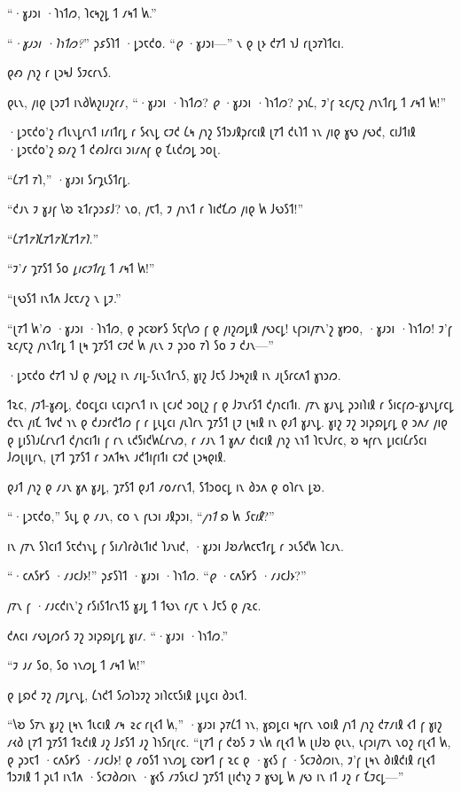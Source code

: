 “·𐑣𐑨𐑮𐑦 ·𐑐𐑪𐑑𐑼, 𐑐𐑤𐑰𐑟𐑛 𐑑 𐑥𐑰𐑑 𐑿.”

“\emph{·𐑣𐑨𐑮𐑦 ·𐑐𐑪𐑑𐑼?}” 𐑜𐑭𐑕𐑐𐑑 ·𐑛𐑮𐑱𐑒𐑴. “\emph{𐑞} ·𐑣𐑨𐑮𐑦—” 𐑯 𐑞 𐑚𐑶 𐑒𐑳𐑑 𐑪𐑓 𐑩𐑚𐑮𐑳𐑐𐑑𐑤𐑦.

𐑞𐑺 𐑢𐑪𐑟 𐑩 𐑚𐑮𐑰𐑓 𐑕𐑲𐑤𐑩𐑯𐑕.

𐑞𐑧𐑯, 𐑢𐑦𐑞 𐑚𐑮𐑲𐑑 𐑦𐑯𐑔𐑿𐑟𐑦𐑨𐑟𐑩𐑥, “·𐑣𐑨𐑮𐑦 ·𐑐𐑪𐑑𐑼? \emph{𐑞} ·𐑣𐑨𐑮𐑦 ·𐑐𐑪𐑑𐑼? 𐑜𐑪𐑖, 𐑲'𐑝 𐑷𐑤𐑢𐑱𐑟 𐑢𐑪𐑯𐑑𐑩𐑛 𐑑 𐑥𐑰𐑑 𐑿!”

·𐑛𐑮𐑱𐑒𐑴'𐑟 𐑩𐑑𐑧𐑯𐑛𐑩𐑯𐑑 𐑦𐑥𐑦𐑑𐑩𐑛 𐑩 𐑕𐑬𐑯𐑛 𐑤𐑲𐑒 𐑖𐑰 𐑢𐑪𐑟 𐑕𐑑𐑮𐑨𐑙𐑜𐑩𐑤𐑦𐑙 𐑚𐑳𐑑 𐑒𐑧𐑐𐑑 𐑪𐑯 𐑢𐑦𐑞 𐑣𐑻 𐑢𐑻𐑒, 𐑤𐑦𐑓𐑑𐑦𐑙 ·𐑛𐑮𐑱𐑒𐑴'𐑟 𐑸𐑥𐑟 𐑑 𐑒𐑺𐑓𐑩𐑤𐑦 𐑮𐑦𐑥𐑵𐑝 𐑞 𐑗𐑧𐑒𐑼𐑛 𐑮𐑴𐑚.

“𐑖𐑳𐑑 𐑳𐑐,” ·𐑣𐑨𐑮𐑦 𐑕𐑩𐑡𐑧𐑕𐑑𐑩𐑛.

“𐑒𐑨𐑯 𐑲 𐑣𐑨𐑝 𐑘𐑹 𐑷𐑑𐑩𐑜𐑮𐑭𐑓? 𐑯𐑴, 𐑢𐑱𐑑, 𐑲 𐑢𐑪𐑯𐑑 𐑩 𐑐𐑦𐑒𐑗𐑼 𐑢𐑦𐑞 𐑿 𐑓𐑻𐑕𐑑!”

“𐑖𐑳𐑑\emph{𐑳𐑐}𐑖𐑳𐑑\emph{𐑳𐑐}𐑖𐑳𐑑\emph{𐑳𐑐.}”

“𐑲'𐑥 𐑡𐑳𐑕𐑑 𐑕𐑴 \emph{𐑛𐑦𐑤𐑲𐑑𐑩𐑛} 𐑑 𐑥𐑰𐑑 𐑿!”

“𐑚𐑻𐑕𐑑 𐑦𐑯𐑑𐑵 𐑓𐑤𐑱𐑥𐑟 𐑯 𐑛𐑲.”

“𐑚𐑳𐑑 𐑿'𐑼 ·𐑣𐑨𐑮𐑦 ·𐑐𐑪𐑑𐑼, 𐑞 𐑜𐑤𐑹𐑾𐑕 𐑕𐑱𐑝𐑘𐑼 𐑝 𐑞 𐑢𐑦𐑟𐑼𐑛𐑦𐑙 𐑢𐑻𐑤𐑛! 𐑧𐑝𐑮𐑦𐑢𐑳𐑯'𐑟 𐑣𐑽𐑴, ·𐑣𐑨𐑮𐑦 ·𐑐𐑪𐑑𐑼! 𐑲'𐑝 𐑷𐑤𐑢𐑱𐑟 𐑢𐑪𐑯𐑑𐑩𐑛 𐑑 𐑚𐑰 𐑡𐑳𐑕𐑑 𐑤𐑲𐑒 𐑿 𐑢𐑧𐑯 𐑲 𐑜𐑮𐑴 𐑳𐑐 𐑕𐑴 𐑲 𐑒𐑨𐑯—”

·𐑛𐑮𐑱𐑒𐑴 𐑒𐑳𐑑 𐑪𐑓 𐑞 𐑢𐑻𐑛𐑟 𐑦𐑯 𐑥𐑦𐑛-𐑕𐑧𐑯𐑑𐑩𐑯𐑕, 𐑣𐑦𐑟 𐑓𐑱𐑕 𐑓𐑮𐑰𐑟𐑦𐑙 𐑦𐑯 𐑨𐑚𐑕𐑩𐑤𐑵𐑑 𐑣𐑪𐑮𐑼.

𐑑𐑷𐑤, 𐑢𐑲𐑑-𐑣𐑺𐑛, 𐑒𐑴𐑤𐑛𐑤𐑦 𐑧𐑤𐑦𐑜𐑩𐑯𐑑 𐑦𐑯 𐑚𐑤𐑨𐑒 𐑮𐑴𐑚𐑟 𐑝 𐑞 𐑓𐑲𐑯𐑩𐑕𐑑 𐑒𐑢𐑪𐑤𐑦𐑑𐑦. 𐑢𐑳𐑯 𐑣𐑨𐑯𐑛 𐑜𐑮𐑦𐑐𐑦𐑙 𐑩 𐑕𐑦𐑤𐑝𐑼-𐑣𐑨𐑯𐑛𐑩𐑤𐑛 𐑒𐑱𐑯 𐑢𐑦𐑗 𐑑𐑫𐑒 𐑪𐑯 𐑞 𐑒𐑨𐑮𐑩𐑒𐑑𐑼 𐑝 𐑩 𐑛𐑧𐑛𐑤𐑦 𐑢𐑧𐑐𐑩𐑯 𐑡𐑳𐑕𐑑 𐑚𐑲 𐑚𐑰𐑦𐑙 𐑦𐑯 𐑞𐑨𐑑 𐑣𐑨𐑯𐑛. 𐑣𐑦𐑟 𐑲𐑟 𐑮𐑦𐑜𐑸𐑛𐑩𐑛 𐑞 𐑮𐑵𐑥 𐑢𐑦𐑞 𐑞 𐑛𐑦𐑕𐑐𐑨𐑖𐑩𐑯𐑩𐑑 𐑒𐑢𐑪𐑤𐑦𐑑𐑦 𐑝 𐑩𐑯 𐑧𐑒𐑕𐑦𐑒𐑿𐑖𐑩𐑯𐑼, 𐑩 𐑥𐑨𐑯 𐑑 𐑣𐑵𐑥 𐑒𐑦𐑤𐑦𐑙 𐑢𐑪𐑟 𐑯𐑪𐑑 𐑐𐑱𐑯𐑓𐑩𐑤, 𐑹 𐑰𐑝𐑩𐑯 𐑛𐑦𐑤𐑦𐑖𐑩𐑕𐑤𐑦 𐑓𐑼𐑚𐑦𐑛𐑩𐑯, 𐑚𐑳𐑑 𐑡𐑳𐑕𐑑 𐑩 𐑮𐑵𐑑𐑰𐑯 𐑨𐑒𐑑𐑦𐑝𐑦𐑑𐑦 𐑤𐑲𐑒 𐑚𐑮𐑰𐑞𐑦𐑙.

𐑞𐑨𐑑 𐑢𐑪𐑟 𐑞 𐑥𐑨𐑯 𐑣𐑵 𐑣𐑨𐑛, 𐑡𐑳𐑕𐑑 𐑞𐑨𐑑 𐑥𐑴𐑥𐑩𐑯𐑑, 𐑕𐑑𐑮𐑴𐑤𐑛 𐑦𐑯 𐑔𐑮𐑵 𐑞 𐑴𐑐𐑩𐑯 𐑛𐑹.

“·𐑛𐑮𐑱𐑒𐑴,” 𐑕𐑧𐑛 𐑞 𐑥𐑨𐑯, 𐑤𐑴 𐑯 𐑝𐑧𐑮𐑦 𐑨𐑙𐑜𐑮𐑦, “\emph{𐑢𐑪𐑑} 𐑸 𐑿 \emph{𐑕𐑱𐑦𐑙}?”

𐑦𐑯 𐑢𐑳𐑯 𐑕𐑐𐑤𐑦𐑑 𐑕𐑱𐑒𐑪𐑯𐑛 𐑝 𐑕𐑦𐑥𐑐𐑩𐑔𐑧𐑑𐑦𐑒 𐑐𐑨𐑯𐑦𐑒, ·𐑣𐑨𐑮𐑦 𐑓𐑹𐑥𐑿𐑤𐑱𐑑𐑩𐑛 𐑩 𐑮𐑧𐑕𐑒𐑿 𐑐𐑤𐑨𐑯.

“·𐑤𐑵𐑕𐑾𐑕 ·𐑥𐑨𐑤𐑓𐑶!” 𐑜𐑭𐑕𐑐𐑑 ·𐑣𐑨𐑮𐑦 ·𐑐𐑪𐑑𐑼. “\emph{𐑞} ·𐑤𐑵𐑕𐑾𐑕 ·𐑥𐑨𐑤𐑓𐑶?”

𐑢𐑳𐑯 𐑝 ·𐑥𐑨𐑤𐑒𐑦𐑯'𐑟 𐑩𐑕𐑦𐑕𐑑𐑩𐑯𐑑𐑕 𐑣𐑨𐑛 𐑑 𐑑𐑻𐑯 𐑩𐑢𐑱 𐑯 𐑓𐑱𐑕 𐑞 𐑢𐑷𐑤.

𐑒𐑵𐑤𐑦 𐑥𐑻𐑛𐑼𐑩𐑕 𐑲𐑟 𐑮𐑦𐑜𐑸𐑛𐑩𐑛 𐑣𐑦𐑥. “·𐑣𐑨𐑮𐑦 ·𐑐𐑪𐑑𐑼.”

“𐑲 𐑨𐑥 𐑕𐑴, 𐑕𐑴 𐑪𐑯𐑼𐑛 𐑑 𐑥𐑰𐑑 𐑿!”

𐑞 𐑛𐑸𐑒 𐑲𐑟 𐑢𐑲𐑛𐑩𐑯𐑛, 𐑖𐑪𐑒𐑑 𐑕𐑼𐑐𐑮𐑲𐑟 𐑮𐑦𐑐𐑤𐑱𐑕𐑦𐑙 𐑛𐑧𐑛𐑤𐑦 𐑔𐑮𐑧𐑑.

“𐑘𐑹 𐑕𐑳𐑯 𐑣𐑨𐑟 𐑚𐑰𐑯 𐑑𐑧𐑤𐑦𐑙 𐑥𐑰 \emph{𐑷𐑤} 𐑩𐑚𐑬𐑑 𐑿,” ·𐑣𐑨𐑮𐑦 𐑜𐑳𐑖𐑑 𐑪𐑯, 𐑣𐑸𐑛𐑤𐑦 𐑰𐑝𐑩𐑯 𐑯𐑴𐑦𐑙 𐑢𐑪𐑑 𐑢𐑪𐑟 𐑒𐑳𐑥𐑦𐑙 𐑬𐑑 𐑝 𐑣𐑦𐑟 𐑥𐑬𐑔 𐑚𐑳𐑑 𐑡𐑳𐑕𐑑 𐑑𐑷𐑒𐑦𐑙 𐑨𐑟 𐑓𐑭𐑕𐑑 𐑨𐑟 𐑐𐑪𐑕𐑩𐑚𐑩𐑤. “𐑚𐑳𐑑 𐑝 𐑒𐑹𐑕 𐑲 𐑯𐑿 𐑩𐑚𐑬𐑑 𐑿 𐑚𐑦𐑓𐑹 𐑞𐑧𐑯, 𐑧𐑝𐑮𐑦𐑢𐑳𐑯 𐑯𐑴𐑟 𐑩𐑚𐑬𐑑 𐑿, 𐑞 𐑜𐑮𐑱𐑑 ·𐑤𐑵𐑕𐑾𐑕 ·𐑥𐑨𐑤𐑓𐑶! 𐑞 𐑥𐑴𐑕𐑑 𐑪𐑯𐑼𐑛 𐑤𐑹𐑾𐑑 𐑝 𐑷𐑤 𐑞 ·𐑣𐑬𐑕 𐑝 ·𐑕𐑤𐑲𐑔𐑼𐑦𐑯, 𐑲'𐑝 𐑚𐑰𐑯 𐑔𐑦𐑙𐑒𐑦𐑙 𐑩𐑚𐑬𐑑 𐑑𐑮𐑲𐑦𐑙 𐑑 𐑜𐑧𐑑 𐑦𐑯𐑑𐑵 ·𐑕𐑤𐑲𐑔𐑼𐑦𐑯 ·𐑣𐑬𐑕 𐑥𐑲𐑕𐑧𐑤𐑓 𐑡𐑳𐑕𐑑 𐑚𐑦𐑒𐑪𐑟 𐑲 𐑣𐑻𐑛 𐑿 𐑢𐑻 𐑦𐑯 𐑦𐑑 𐑨𐑟 𐑩 𐑗𐑲𐑤𐑛—”

